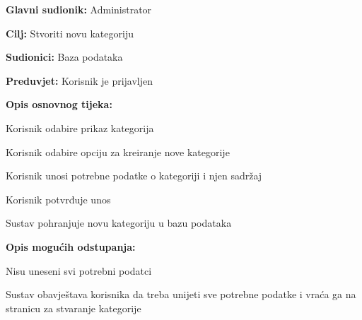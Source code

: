 					\noindent {}
					\begin{packed_item}
						
						\item \textbf{Glavni sudionik:} Administrator
						\item  \textbf{Cilj:} Stvoriti novu kategoriju
						\item  \textbf{Sudionici:} Baza podataka
						\item  \textbf{Preduvjet:} Korisnik je prijavljen
						\item  \textbf{Opis osnovnog tijeka:}
						
						\item[] \begin{packed_enum}
							
							\item Korisnik odabire prikaz kategorija
							\item Korisnik odabire opciju za kreiranje nove kategorije
							\item Korisnik unosi potrebne podatke o kategoriji i njen sadržaj
							\item Korisnik potvrđuje unos
							\item Sustav pohranjuje novu kategoriju u bazu podataka
							
						\end{packed_enum}
						
						\item  \textbf{Opis mogućih odstupanja:}
						
						\item[] \begin{packed_item}
							
							\item[4.a] Nisu uneseni svi potrebni podatci
							\item[] \begin{packed_enum}
								
								\item Sustav obavještava korisnika da treba unijeti sve potrebne podatke i vraća ga na stranicu za stvaranje kategorije
								
							\end{packed_enum}
							
						\end{packed_item}
						
					\end{packed_item}
			
